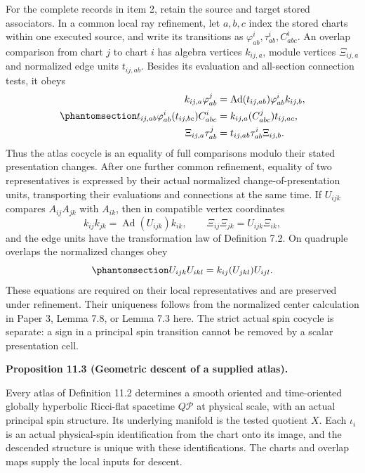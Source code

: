 \documentclass[
  english,
  11pt,
  reqno]{amsart}
\makeatletter
\newcommand{\pandocstatementheading}[1]{%
  \par\addpenalty{\@beginparpenalty}%
  \addvspace{.5\baselineskip plus .2\baselineskip minus .2\baselineskip}%
  {\normalfont\bfseries #1\par}%
  \nobreak\@afterindenttrue\@afterheading
}
\makeatother
\begin{document}
For the complete records in item 2, retain the source and target stored
associators. In a common local ray refinement, let \(a,b,c\) index the
stored charts within one executed source, and write its transitions as
\(\varphi^i_{ab},\tau^i_{ab},C^i_{abc}\). An overlap comparison from
chart \(j\) to chart \(i\) has algebra vertices \(k_{ij,a}\), module
vertices \(\Xi_{ij,a}\) and normalized edge units \(t_{ij,ab}\). Besides
its evaluation and all-section connection tests, it obeys
\begin{equation}\protect\phantomsection\label{eq:ordinary-atlas-full-overlap-equations}{
\begin{aligned}
k_{ij,a}\varphi^j_{ab}
 &=\operatorname{Ad}(t_{ij,ab})\varphi^i_{ab}k_{ij,b},\\
t_{ij,ab}\varphi^i_{ab}(t_{ij,bc})C^i_{abc}
 &=k_{ij,a}(C^j_{abc})t_{ij,ac},\\
\Xi_{ij,a}\tau^j_{ab}
 &=t_{ij,ab}\tau^i_{ab}\Xi_{ij,b}.
\end{aligned}
}\end{equation} Thus the atlas cocycle is an equality of full
comparisons modulo their stated presentation changes. After one further
common refinement, equality of two representatives is expressed by their
actual normalized change-of-presentation units, transporting their
evaluations and connections at the same time. If \(U_{ijk}\) compares
\(A_{ij}A_{jk}\) with \(A_{ik}\), then in compatible vertex coordinates
\[
k_{ij}k_{jk}=\operatorname{Ad}(U_{ijk})k_{ik},
\qquad
\Xi_{ij}\Xi_{jk}=U_{ijk}\Xi_{ik},
\] and the edge units have the transformation law of Definition 7.2. On
quadruple overlaps the normalized changes obey
\begin{equation}\protect\phantomsection\label{eq:ordinary-atlas-presentation-coherence}{
U_{ijk}U_{ikl}=k_{ij}(U_{jkl})U_{ijl}.
}\end{equation} These equations are required on their local
representatives and are preserved under refinement. Their uniqueness
follows from the normalized center calculation in Paper 3, Lemma 7.8, or
Lemma 7.3 here. The strict actual spin cocycle is separate: a sign in a
principal spin transition cannot be removed by a scalar presentation
cell.

\pandocstatementheading{\protect{}\label{prop:ordinary-atlas-geometric-descent}Proposition 11.3 (Geometric descent of a supplied atlas).}

Every atlas of Definition 11.2 determines a smooth oriented and
time-oriented globally hyperbolic Ricci-flat spacetime \(Q\mathcal P\)
at physical scale, with an actual principal spin structure. Its
underlying manifold is the tested quotient \(X\). Each \(\iota_i\) is an
actual physical-spin identification from the chart onto its image, and
the descended structure is unique with these identifications. The charts
and overlap maps supply the local inputs for descent.
\end{document}
